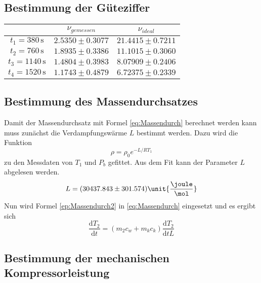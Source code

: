 \subsection{Bestimmung der Güteziffer}

\begin{table}[H]
  \centering
  \label{tab:gueteziffer}
  \begin{tabular}{S S S}
    \toprule
    & {$ν_{gemessen}$} & {$ν_{ideal}$} \\
    \midrule
    {$t_1 = 380  \, \unit{\second}$} & {$2.5350 \pm 0.3077$} & {$21.4415 \pm 0.7211$} \\
    {$t_2 = 760  \, \unit{\second}$} & {$1.8935 \pm 0.3386$} & {$11.1015 \pm 0.3060$} \\
    {$t_3 = 1140 \, \unit{\second}$} & {$1.4804 \pm 0.3983$} & {$8.07909 \pm 0.2406$} \\
    {$t_4 = 1520 \, \unit{\second}$} & {$1.1743 \pm 0.4879$} & {$6.72375 \pm 0.2339$} \\
    \bottomrule
  \end{tabular}
\end{table}

\subsection{Bestimmung des Massendurchsatzes}

Damit der Massendurchsatz mit Formel \eqref{eq:Massendurch} berechnet werden kann muss zunächst die Verdampfungswärme $L$ bestimmt werden.
Dazu wird die Funktion 
\begin{equation}
  \rho = \rho_0 e^{-L/R T_1}
\end{equation}
zu den Messdaten von $T_1$ und $P_b$ gefittet. Aus dem Fit kann der Parameter $L$ abgelesen werden.\\

\begin{equation}
  L = (30437.843 \pm 301.574) \unit{\dfrac{\joule}{\mol}}
\end{equation}
Nun wird Formel \eqref{ep:Massendurch2} in \eqref{eq:Massendurch} eingesetzt und es ergibt sich
\begin{equation}
  \dfrac{\text{d}T_2}{\text{d}t} = (m_2c_w +m_kc_k)\dfrac{\text{d}T_2}{\text{d}tL}
\end{equation}


\subsection{Bestimmung der mechanischen Kompressorleistung}

